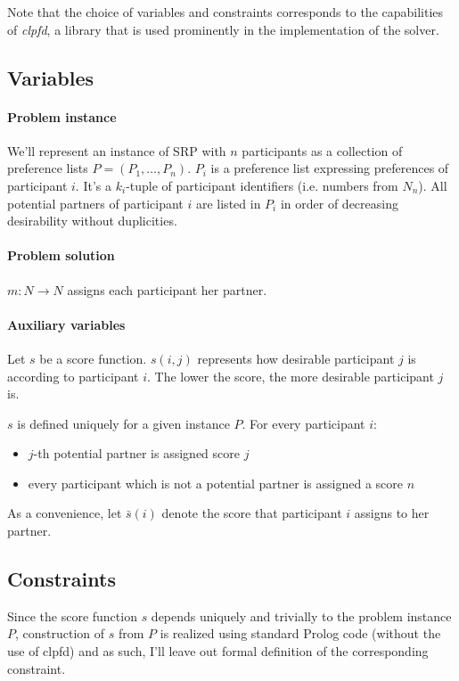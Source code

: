 \documentclass{article}
\begin{document}
Note that the choice of variables and constraints corresponds to the capabilities
of \emph{clpfd}, a library that is used prominently in the implementation
of the solver.

\subsection{Variables}
\paragraph{Problem instance}
We'll represent an instance of SRP with $n$ participants as
a collection of preference lists $P = (P_1, \ldots, P_n)$.
$P_i$ is a preference list expressing preferences of participant $i$.
It's a $k_i$-tuple of participant identifiers (i.e. numbers from $N_n$).
All potential partners of participant $i$ are listed in $P_i$ in order of decreasing
desirability without duplicities.

\paragraph{Problem solution}
$m: N \rightarrow N$ assigns each participant her partner.

\paragraph{Auxiliary variables}
Let $s$ be a score function.
$s(i,j)$ represents how desirable participant $j$ is according to participant $i$.
The lower the score, the more desirable participant $j$ is.

$s$ is defined uniquely for a given instance $P$.
For every participant $i$:

\begin{itemize}
\item $j$-th potential partner is assigned score $j$
\item every participant which is not a potential partner is assigned a score $n$
\end{itemize}

As a convenience, let $\bar{s}(i)$ denote the score that participant $i$ assigns to her partner.

\subsection{Constraints}
Since the score function $s$ depends uniquely and trivially
to the problem instance $P$,
construction of $s$ from $P$ is realized
using standard Prolog code (without the use of clpfd) and as such,
I'll leave out formal definition of the corresponding constraint.
\end{document}
